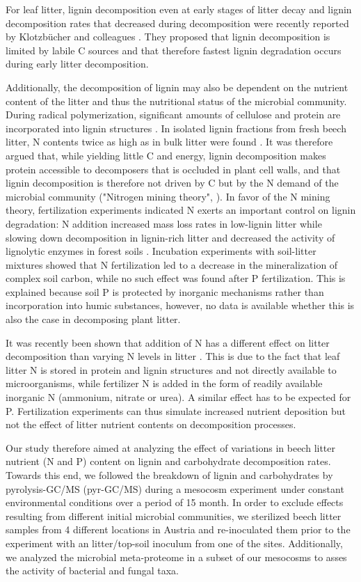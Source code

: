 For leaf litter, lignin decomposition even at early stages of litter decay and lignin decomposition rates that decreased during decomposition were recently reported by Klotzb\"{u}cher and colleagues \cite{Klotzbucher2011}. They proposed that lignin decomposition is limited by labile C sources and that therefore fastest lignin degradation occurs during early litter decomposition. 

Additionally, the decomposition of lignin may also be dependent on the nutrient content of the litter and thus the nutritional status of the microbial community. During radical polymerization, significant amounts of cellulose and protein are incorporated into lignin structures \cite{Achyuthan2010}. In isolated lignin fractions from fresh beech litter, N contents twice as high as in bulk litter were found \cite{Dyckmans2002}. It was therefore argued that, while yielding little C and energy, lignin decomposition makes protein accessible to decomposers that is occluded in plant cell walls, and that lignin decomposition is therefore not driven by C but by the N demand of the microbial community ("Nitrogen mining theory", \cite{Craine2007}). In favor of the N mining theory, fertilization experiments indicated N exerts an important control on lignin degradation: N addition increased mass loss rates in low-lignin litter while slowing down decomposition in lignin-rich litter \cite{Knorr2005} and decreased the 
activity of lignolytic enzymes in forest soils \cite{Sinsabaugh2010}. Incubation experiments with soil-litter mixtures
showed that N fertilization led to a decrease in the mineralization of complex soil carbon, while no such effect was found after P fertilization\cite{Craine2007}. This is explained because soil P is protected by inorganic mechanisms rather than incorporation into humic substances, however, no data is available whether this is also the case in decomposing plant litter.

It was recently been shown that addition of N has a different effect on litter decomposition than varying N levels in litter \cite{Talbot2011}. This is due to the fact that leaf litter N is stored in protein and lignin structures and not directly available to microorganisms, while fertilizer N is added in the form of readily available inorganic N (ammonium, nitrate or urea). A similar effect has to be expected for P. Fertilization experiments can thus simulate increased nutrient deposition but not the effect of litter nutrient contents on decomposition processes. 

Our study therefore aimed at analyzing the effect of variations in beech litter nutrient (N and P) content on lignin and carbohydrate decomposition rates. Towards this end, we followed the breakdown of lignin and carbohydrates by pyrolysis-GC/MS (pyr-GC/MS) during a mesocosm experiment under constant environmental conditions over a period of 15 month. In order to exclude effects resulting from different initial microbial communities, we sterilized beech litter samples from 4 different locations in Austria and re-inoculated them prior to the experiment with an litter/top-soil inoculum from one of the sites. Additionally, we analyzed the microbial meta-proteome in a subset of our mesocosms to asses the activity of bacterial and fungal taxa.

